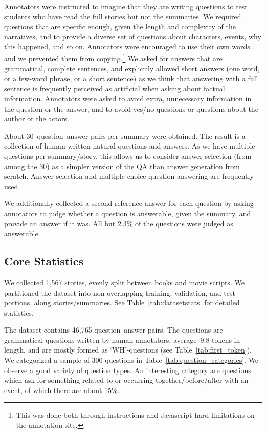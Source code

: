 \documentclass[11pt,letterpaper]{article}
\begin{document}
Annotators were instructed to imagine that they are writing questions to test students who have read the full stories but not the summaries. We required questions that are specific enough, given the length and complexity of the narratives, and to provide a diverse set of questions about characters, events, why this happened, and so on. Annotators were encouraged to use their own words and we prevented them from copying.\footnote{This was done both through instructions and Javascript hard limitations on the annotation site.}
We asked for answers that are grammatical, complete sentences, and explicitly allowed short answers (one word, or a few-word phrase, or a short sentence) as we think that answering with a full sentence is frequently perceived as artificial when asking about factual information.
Annotators were asked to avoid extra, unnecessary information in the question or the answer, and to avoid yes/no questions or questions about the author or the actors.

About 30~question--answer pairs per summary were obtained. The result is a collection of human written natural questions and answers. As we have multiple questions per summary/story, this allows us to consider answer selection (from among the 30) as a simpler version of the QA than answer generation from scratch. Answer selection \cite{P16-1145} and multiple-choice question answering \cite{mctest,hill-cbt} are frequently used.

We additionally collected a second reference answer for each question by asking annotators to judge whether a question is answerable, given the summary, and provide an answer if it was. All but 2.3\% of the questions were judged as answerable.






\subsection{Core Statistics}


We collected 1,567 stories, evenly split between books and movie scripts.
We partitioned the dataset into non-overlapping training, validation, and test portions,
along stories/summaries. See Table~\ref{tab:datasetstats} for detailed statistics.

The dataset contains 46,765 question--answer pairs. The questions are grammatical questions written by human annotators, average~9.8 tokens in length, and are mostly formed as `WH'-questions (see Table~\ref{tab:first_token}). We categorized a sample of 300 questions in Table~\ref{tab:question_categories}. We observe a good variety of question types. An interesting category are questions which ask for something related to or occurring together/before/after with an event, of which there are about 15\%.
\end{document}
